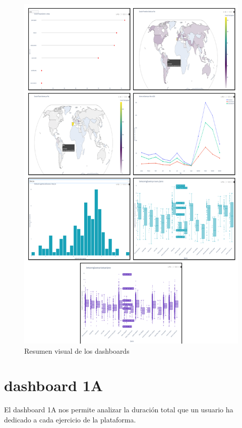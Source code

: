 \documentclass[a4paper, 12pt]{book}
\begin{document}
\begin{figure}[H]
    \centering
\includegraphics[height=0.65\textheight]{img/resumen_dashboards.png}
    \caption{Resumen visual de los dashboards}
    \label{fig:resumen_dashboards}
\end{figure}



\section{dashboard 1A}
    \label{sec:dash1a}


El dashboard 1A nos permite analizar la duración total que un usuario ha dedicado a cada ejercicio de la plataforma.
\end{document}
